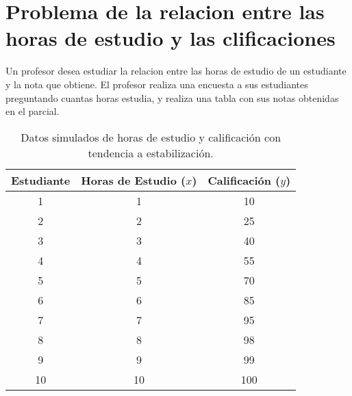 \documentclass{article}
\begin{document}
\section{Problema de la relacion entre las horas de estudio y las clificaciones}

Un profesor desea estudiar la relacion entre las horas de estudio de un estudiante y la nota que obtiene. El profesor
realiza una encuesta a sus estudiantes preguntando cuantas horas estudia, y realiza una tabla con sus notas obtenidas 
en el parcial.

\begin{table}[h!]
    \centering
    \begin{tabular}{ccc}
    \toprule
    \textbf{Estudiante} & \textbf{Horas de Estudio (\(x\))} & \textbf{Calificación (\(y\))} \\
    \midrule
    1  & 1  & 10   \\
    2  & 2  & 25   \\
    3  & 3  & 40   \\
    4  & 4  & 55   \\
    5  & 5  & 70   \\
    6  & 6  & 85   \\
    7  & 7  & 95   \\
    8  & 8  & 98   \\
    9  & 9  & 99   \\
    10 & 10 & 100  \\
    \bottomrule
    \end{tabular}
    \caption{Datos simulados de horas de estudio y calificación con tendencia a estabilización.}
    \label{tabla:horas_estudio_aplanada}
    \end{table}
\end{document}
